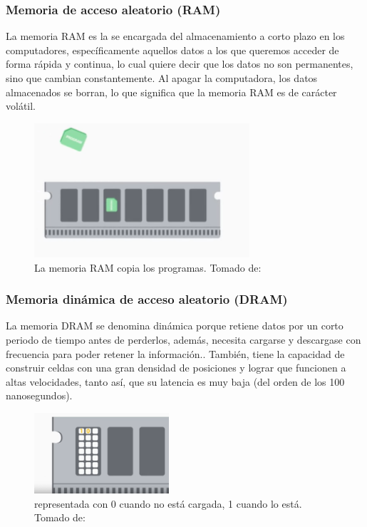 \documentclass{article}
\begin{document}
\subsubsection{Memoria de acceso aleatorio (RAM)}
La memoria RAM es la se encargada del almacenamiento a corto plazo en los computadores, específicamente aquellos datos a los que queremos acceder de forma rápida y continua, lo cual quiere decir que los datos no son permanentes, sino que cambian constantemente. Al apagar la computadora, los datos almacenados se borran, lo que significa que la memoria RAM es de carácter volátil.

\begin{figure}[h]
\includegraphics[width=8cm]{Captura.2.PNG}
\centering
\caption{La memoria RAM copia los programas. Tomado de:\cite{Coursera}}
\label{Captura.2.PNG}
\end{figure}
\subsubsection{Memoria dinámica de acceso aleatorio (DRAM)}
 La memoria DRAM se denomina dinámica porque retiene datos por un corto periodo de tiempo antes de perderlos, además, necesita cargarse y descargase con frecuencia para poder retener la información.\cite[How computer memory works. 2:07]{TEDwebsite}. También, tiene la capacidad de construir celdas con una gran densidad de posiciones y lograr que funcionen a altas velocidades, tanto así, que su latencia es muy baja (del orden de los 100 nanosegundos).

\begin{figure}[h]
\includegraphics[width=5cm]{dram.PNG}
\centering
\caption{representada con 0 cuando no está cargada, 1 cuando lo está. \centering Tomado de:\cite{Coursera}}
\label{dram.PNG}
\end{figure}
\end{document}
